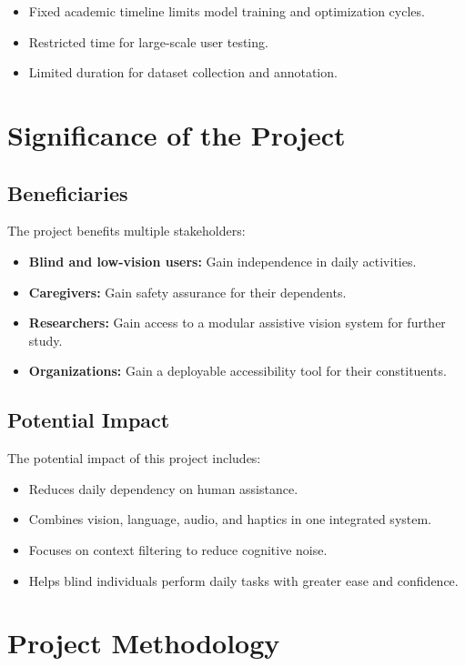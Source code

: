 \documentclass[a4paper]{report}
\begin{document}
\begin{itemize}
  \item Fixed academic timeline limits model training and optimization cycles.
  \item Restricted time for large-scale user testing.
  \item Limited duration for dataset collection and annotation.
\end{itemize}

\section{Significance of the Project}

\subsection{Beneficiaries}

The project benefits multiple stakeholders:

\begin{itemize}
  \item \textbf{Blind and low-vision users:} Gain independence in daily activities.
  \item \textbf{Caregivers:} Gain safety assurance for their dependents.
  \item \textbf{Researchers:} Gain access to a modular assistive vision system for further study.
  \item \textbf{Organizations:} Gain a deployable accessibility tool for their constituents.
\end{itemize}

\subsection{Potential Impact}

The potential impact of this project includes:

\begin{itemize}
  \item Reduces daily dependency on human assistance.
  \item Combines vision, language, audio, and haptics in one integrated system.
  \item Focuses on context filtering to reduce cognitive noise.
  \item Helps blind individuals perform daily tasks with greater ease and confidence.
\end{itemize}

\section{Project Methodology}
\end{document}
